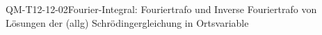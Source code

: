 
\begin{DEF}{QM-T12-12-02}{Fourier-Integral: Fouriertrafo und Inverse Fouriertrafo von Lösungen der (allg) Schrödingergleichung in Ortsvariable}
\end{DEF}
